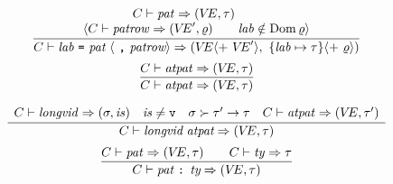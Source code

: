 \begin{equation}	%
\label{longlab-rule}
\frac{\begin{array}{c}
      \C\ts\pat\ra(\VE,\tau)\qquad \\
      \langle\C\ts\labpats\ra(\VE',\varrho)\qquad
      \lab\notin\Dom\varrho\rangle
      \end{array}
}
     {\C\ts\longlabpats\ra
     (\VE\langle +\ \VE'\rangle,\
      \{\lab\mapsto\tau\}\langle +\ \varrho\rangle) }
\end{equation}
%
\begin{equation}	%
\frac{\C\ts\atpat\ra (\VE,\tau)}
     {\C\ts\atpat\ra (\VE,\tau)}\index{31.3}
\end{equation}




\begin{equation}	%
\label{conpat-rule}
\frac{\begin{array}{lccr}
      \C\ts\longvid\ra(\tych,\is) &
      \is \neq \vstatus &
      \tych \succ \tau'\to\tau & 
      \C\ts\atpat\ra(\VE,\tau')      
      \end{array}}
     {\C\ts\conpat\ra (\VE,\tau)}
\end{equation}
\begin{equation}	%
\frac{\C\ts\pat\ra(\VE,\tau)\qquad\C\ts\ty\ra\tau}
     {\C\ts\typedpat\ra (\VE,\tau)}
\end{equation}


